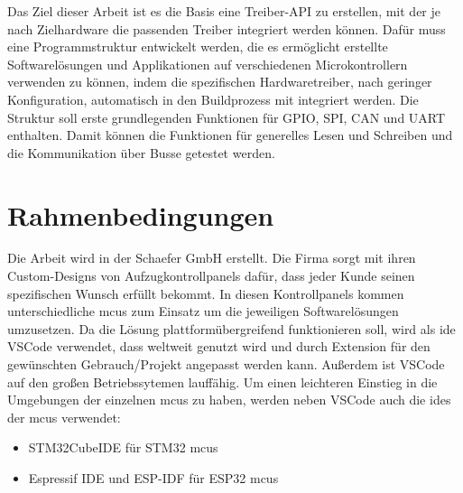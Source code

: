 Das Ziel dieser Arbeit ist es die Basis eine Treiber-API zu erstellen, mit der je nach Zielhardware die passenden Treiber integriert werden können.
Dafür muss eine Programmstruktur entwickelt werden, die es ermöglicht erstellte Softwarelösungen und Applikationen auf verschiedenen Microkontrollern verwenden zu können, indem die spezifischen Hardwaretreiber, nach geringer Konfiguration, automatisch in den Buildprozess mit integriert werden.
Die Struktur soll erste grundlegenden Funktionen für GPIO, SPI, CAN und UART enthalten. 
Damit können die Funktionen für generelles Lesen und Schreiben und die Kommunikation über Busse getestet werden.
\\
%
%
%




\section{Rahmenbedingungen}
Die Arbeit wird in der Schaefer GmbH erstellt. 
Die Firma sorgt mit ihren Custom-Designs von Aufzugkontrollpanels dafür, dass jeder Kunde seinen spezifischen Wunsch erfüllt bekommt.
In diesen Kontrollpanels kommen unterschiedliche \gls{mcu}s zum Einsatz um die jeweiligen Softwarelösungen umzusetzen.
Da die Lösung plattformübergreifend funktionieren soll, wird als \gls{ide} VSCode verwendet, dass weltweit genutzt wird und durch Extension für den gewünschten Gebrauch/Projekt angepasst werden kann. 
Außerdem ist VSCode auf den großen Betriebssytemen lauffähig.
Um einen leichteren Einstieg in die Umgebungen der einzelnen \gls{mcu}s zu haben, werden neben VSCode auch die \gls{ide}s der \gls{mcu}s verwendet:
\begin{itemize}
	\item STM32CubeIDE für STM32 \gls{mcu}s
	\item Espressif IDE und ESP-IDF für ESP32 \gls{mcu}s
\end{itemize}

